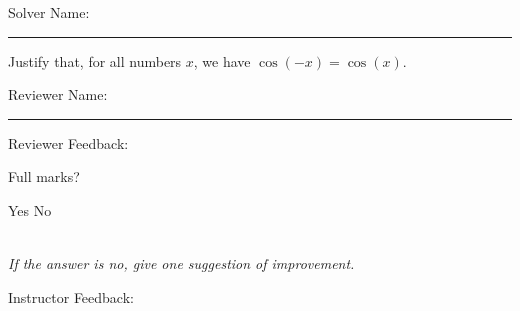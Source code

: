 \documentclass[12pt]{exam}
\begin{document}
\pagestyle{headandfoot}
\firstpageheadrule

Solver Name:\enspace\rule{5cm}{0.8pt}

\begin{questions}
\question
Justify that, for all numbers $x$, we have $\cos(-x)=\cos(x)$.

\end{questions}

Reviewer Name:\enspace\rule{5cm}{0.8pt}

\begin{questions}
\question
Reviewer Feedback:

Full marks? \begin{oneparcheckboxes}
\choice Yes
\choice No
\end{oneparcheckboxes}\\
\textit{If the answer is no, give one suggestion of improvement.}

\question

Instructor Feedback:



\end{questions}
\end{document}
